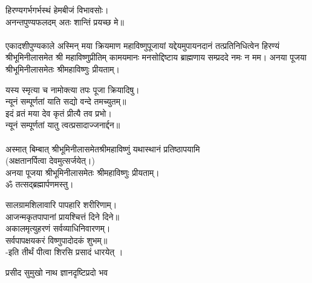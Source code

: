 हिरण्यगर्भगर्भस्थं हेमबीजं विभावसोः।\\
अनन्तपुण्यफलदम् अतः शान्तिं प्रयच्छ मे॥\\
 \\
एकादशीपुण्यकाले अस्मिन् मया क्रियमाण महाविष्णुपूजायां यद्देयमुपायनदानं तत्प्रतिनिधित्वेन हिरण्यं श्रीभूमिनीलासमेत श्री महाविष्णुप्रीतिम् 
कामयमानः मनसोद्दिष्टाय ब्राह्मणाय सम्प्रददे नमः न मम। 
अनया पूजया श्रीभूमिनीलासमेतः श्रीमहाविष्णुः प्रीयताम्। 
 
 यस्य स्मृत्या च नामोक्त्या तपः पूजा क्रियादिषु।\\
न्यूनं सम्पूर्णतां याति सद्यो वन्दे तमच्युतम्॥ \\
इदं व्रतं मया देव कृतं प्रीत्यै तव प्रभो।\\
न्यूनं सम्पूर्णतां यातु त्वत्प्रसादाज्जनार्द्दन॥\\
 \\
अस्मात् बिम्बात् श्रीभूमिनीलासमेतश्रीमहाविष्णुं यथास्थानं प्रतिष्ठापयामि\\
(अक्षतानर्पित्वा देवमुत्सर्जयेत्।)\\
अनया पूजया श्रीभूमिनीलासमेतः श्रीमहाविष्णुः प्रीयताम्। \\
ॐ तत्सद्ब्रह्मार्पणमस्तु।
 
सालग्रामशिलावारि पापहारि शरीरिणाम्।\\
आजन्मकृतपापानां प्रायश्चित्तं दिने दिने॥\\
अकालमृत्युहरणं सर्वव्याधिनिवारणम्।\\
सर्वपापक्षयकरं विष्णुपादोदकं शुभम्॥ \\
 -इति तीर्थं पीत्वा शिरसि प्रसादं धारयेत् ।



{प्रसीद सुमुखो नाथ ज्ञानदृष्टिप्रदो भव}
